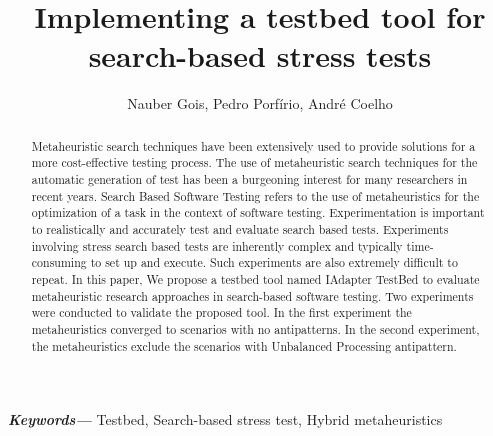 \documentclass[10pt,twocolumn]{article}
\providecommand{\keywords}[1]{\textbf{\textit{Keywords---}} #1}
\begin{document}

\title{\vspace*{-.6in}Implementing a testbed tool for \\  search-based stress tests\vspace*{-.1in}}

\author{Nauber Gois, Pedro Porfírio, André Coelho
      }



\maketitle

\thispagestyle{doi}

\begin{abstract}




Metaheuristic search techniques have been extensively used to provide solutions for a more cost-effective testing process. The use of metaheuristic search techniques for the automatic generation
of test  has been a burgeoning interest for many researchers in recent years. Search Based Software Testing refers to the use of metaheuristics for the optimization of a task in the context of
software testing. Experimentation is important to realistically and accurately
test and evaluate search based tests. Experiments involving stress search based tests are inherently complex and typically time-consuming to set up and
execute. Such experiments are also extremely difficult to
repeat.  In this paper, We propose a testbed tool named IAdapter TestBed to evaluate metaheuristic research approaches in search-based software testing. Two experiments were conducted to validate the proposed tool. In the first experiment the metaheuristics converged to scenarios with no antipatterns. In the second experiment,  the metaheuristics exclude the scenarios with Unbalanced Processing antipattern.

\end{abstract}
\keywords{Testbed, Search-based stress test, Hybrid metaheuristics}
\end{document}
